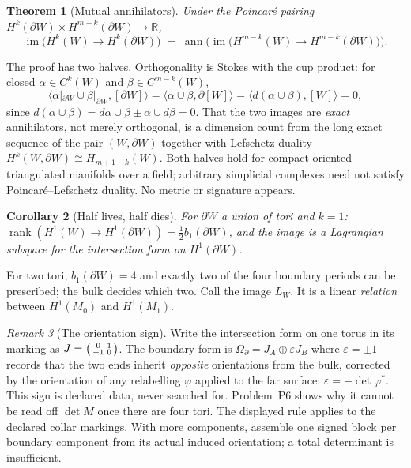 \documentclass[11pt]{article}
\newtheorem{theorem}{Theorem}[section]
\newtheorem{corollary}[theorem]{Corollary}
\theoremstyle{definition}
\theoremstyle{remark}
\newtheorem{remark}[theorem]{Remark}
\newcommand{\R}{\mathbb{R}}
\newcommand{\im}{\operatorname{im}}
\newcommand{\rank}{\operatorname{rank}}
\newcommand{\ann}{\operatorname{ann}}
\begin{document}
\begin{theorem}[Mutual annihilators]\label{thm:annihilators}
Under the Poincar\'e pairing $H^k(\partial W) \times H^{m-k}(\partial W) \to \R$,
\[
  \im\big(H^k(W) \to H^k(\partial W)\big)
  \;=\; \ann\Big(\im\big(H^{m-k}(W) \to H^{m-k}(\partial W)\big)\Big).
\]
\end{theorem}

The proof has two halves. Orthogonality is Stokes with the cup product: for
closed $\alpha \in C^k(W)$ and $\beta \in C^{m-k}(W)$,
\[
  \langle \alpha|_{\partial W} \cup \beta|_{\partial W}, [\partial W]\rangle
  = \langle \alpha \cup \beta, \partial [W]\rangle
  = \langle d(\alpha\cup\beta), [W]\rangle = 0,
\]
since $d(\alpha\cup\beta) = d\alpha \cup \beta \pm \alpha \cup d\beta = 0$.
That the two images are \emph{exact} annihilators, not merely orthogonal, is
a dimension count from the long exact sequence of the pair $(W, \partial W)$
together with Lefschetz duality $H^k(W,\partial W) \cong H_{m+1-k}(W)$. Both
halves hold for compact oriented triangulated manifolds over a field;
arbitrary simplicial complexes need not satisfy Poincar\'e--Lefschetz
duality. No metric or signature appears.

\begin{corollary}[Half lives, half dies]\label{cor:half}
For $\partial W$ a union of tori and $k = 1$: $\rank(H^1(W) \to H^1(\partial W))
= \tfrac12 b_1(\partial W)$, and the image is a Lagrangian subspace for the
intersection form on $H^1(\partial W)$.
\end{corollary}

For two tori, $b_1(\partial W) = 4$ and exactly two of the four boundary
periods can be prescribed; the bulk decides which two. Call the image
$L_W$. It is a linear \emph{relation} between $H^1(M_0)$ and $H^1(M_1)$.

\begin{remark}[The orientation sign]\label{rem:sign}
Write the intersection form on one torus in its marking as $J =
\begin{psmallmatrix} 0 & 1\\ -1 & 0\end{psmallmatrix}$. The boundary form is
$\Omega_\partial = J_A \oplus \varepsilon J_B$ where $\varepsilon = \pm 1$ records that
the two ends inherit \emph{opposite} orientations from the bulk, corrected
by the orientation of any relabelling $\varphi$ applied to the far surface:
$\varepsilon = -\det\varphi^*$. This sign is declared data, never searched
for. Problem~P6 shows why it cannot be read off $\det M$ once
there are four tori. The displayed rule applies to the declared collar
markings. With more components, assemble one signed block per boundary
component from its actual induced orientation; a total determinant is
insufficient.
\end{remark}
\end{document}
